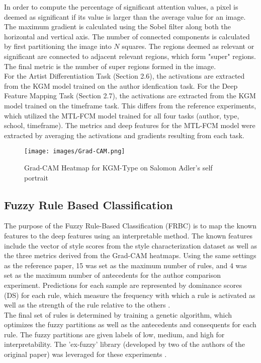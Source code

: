 \documentclass{article}
\begin{document}
In order to compute the percentage of significant attention values, a pixel is deemed as significant if its value is larger than the average value for an image. The maximum gradient is calculated using the Sobel filter along both the horizontal and vertical axis. The number of connected components is calculated by first partitioning the image into $N$ squares. The regions deemed as relevant or significant are connected to adjacent relevant regions, which form "super" regions. The final metric is the number of super regions formed in the image.\\

For the Artist Differentiation Task (Section 2.6), the activations are extracted from the KGM model trained on the author idenfication task. For the Deep Feature Mapping Task (Section 2.7), the activations are extracted from the KGM model trained on the timeframe task. This differs from the reference experiments, which utilized the MTL-FCM model trained for all four tasks (author, type, school, timeframe). The metrics and deep features for the MTL-FCM model were extracted by averaging the activations and gradients resulting from each task.

\begin{figure}[h]
    \centering
    \texttt{[image: images/Grad-CAM.png]}
    \caption{Grad-CAM Heatmap for KGM-Type on Salomon Adler's self portrait }
    \label{F:1}
\end{figure}

\subsection{Fuzzy Rule Based Classification}
The purpose of the Fuzzy Rule-Based Classification (FRBC) is to map the known features to the deep features using an interpretable method. The known features include the vector of style scores from the style characterization dataset as well as the three metrics derived from the Grad-CAM heatmaps. Using the same settings as the reference paper, 15 was set as the maximum number of rules, and 4 was set as the maximum number of antecedents for the author comparison experiment. Predictions for each sample are represented by dominance scores (DS) for each rule, which measure the frequency with which a rule is activated as well as the strength of the rule relative to the others \cite{andreu}.\\

The final set of rules is determined by training a genetic algorithm, which optimizes the fuzzy partitions as well as the antecedents and consequents for each rule. The fuzzy partitions are given labels of low, medium, and high for interpretability. The 'ex-fuzzy' library (developed by two of the authors of the original paper) was leveraged for these experiments \cite{exfuzzy}.
\end{document}
